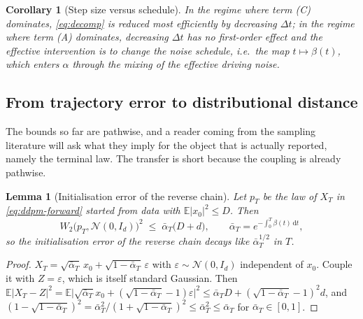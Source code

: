 \documentclass[a4paper,fleqn]{cas-dc}
\newtheorem{lemma}[theorem]{Lemma}
\newtheorem{corollary}[theorem]{Corollary}
\theoremstyle{definition}
\newcommand{\E}{\mathbb{E}}
\newcommand{\dd}{\,\mathrm{d}}
\begin{document}
\begin{corollary}[Step size versus schedule]
\label{cor:rule}
In the regime where term (C) dominates, \eqref{eq:decomp} is reduced most efficiently
by decreasing $\Delta t$; in the regime where term (A) dominates, decreasing
$\Delta t$ has no first-order effect and the effective intervention is to change the
noise schedule, i.e.\ the map $t\mapsto\beta(t)$, which enters $\alpha$ through the
mixing of the effective driving noise.
\end{corollary}

\subsection{From trajectory error to distributional distance}
\label{sec:transfer}

The bounds so far are pathwise, and a reader coming from the sampling literature
will ask what they imply for the object that is actually reported, namely the
terminal law. The transfer is short because the coupling is already pathwise.

\begin{lemma}[Initialisation error of the reverse chain]
\label{lem:init}
Let $p_{T}$ be the law of $X_{T}$ in \eqref{eq:ddpm-forward} started from data
with $\E\lvert x_{0}\rvert^{2}\le D$. Then
\begin{equation}
W_{2}\bigl(p_{T},\mathcal{N}(0,I_{d})\bigr)^{2}
\;\le\;\bar\alpha_{T}\bigl(D+d\bigr),
\qquad \bar\alpha_{T}=e^{-\int_{0}^{T}\beta(t)\dd t},
\label{eq:init}
\end{equation}
so the initialisation error of the reverse chain decays like
$\bar\alpha_{T}^{1/2}$ in $T$.
\end{lemma}

\begin{proof}
$X_{T}=\sqrt{\bar\alpha_{T}}\,x_{0}+\sqrt{1-\bar\alpha_{T}}\,\varepsilon$ with
$\varepsilon\sim\mathcal{N}(0,I_{d})$ independent of $x_{0}$. Couple it with
$Z=\varepsilon$, which is itself standard Gaussian. Then
$\E\lvert X_{T}-Z\rvert^{2}
=\E\lvert\sqrt{\bar\alpha_{T}}x_{0}+(\sqrt{1-\bar\alpha_{T}}-1)\varepsilon\rvert^{2}
\le\bar\alpha_{T}D+(\sqrt{1-\bar\alpha_{T}}-1)^{2}d$, and
$(1-\sqrt{1-\bar\alpha_{T}})^{2}=\bar\alpha_{T}^{2}/(1+\sqrt{1-\bar\alpha_{T}})^{2}\le\bar\alpha_{T}^{2}\le\bar\alpha_{T}$ for $\bar\alpha_{T}\in[0,1]$.
\end{proof}
\end{document}
